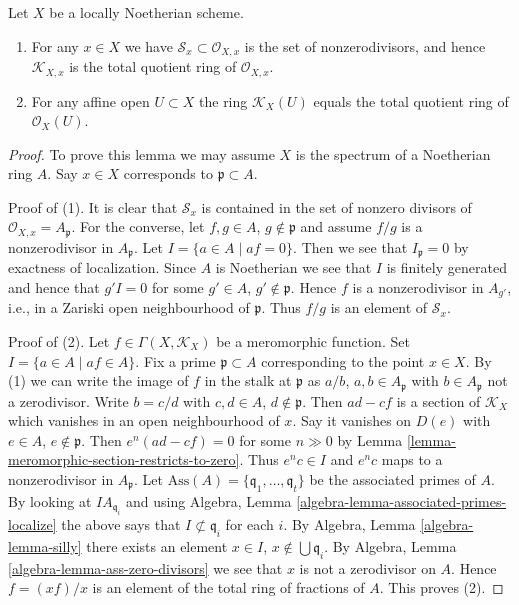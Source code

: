 \begin{lemma}
\label{lemma-locally-Noetherian-K}
Let $X$ be a locally Noetherian scheme.
\begin{enumerate}
\item For any $x \in X$ we have $\mathcal{S}_x \subset \mathcal{O}_{X, x}$
is the set of nonzerodivisors, and hence $\mathcal{K}_{X, x}$
is the total quotient ring of $\mathcal{O}_{X, x}$.
\item For any affine open $U \subset X$ the ring
$\mathcal{K}_X(U)$ equals the total quotient ring of $\mathcal{O}_X(U)$.
\end{enumerate}
\end{lemma}

\begin{proof}
To prove this lemma we may assume $X$ is the spectrum of a Noetherian
ring $A$. Say $x \in X$ corresponds to $\mathfrak p \subset A$.

\medskip\noindent
Proof of (1). It is clear that $\mathcal{S}_x$ is contained
in the set of nonzero divisors of $\mathcal{O}_{X, x} = A_\mathfrak p$.
For the converse, let $f, g \in A$, $g \not \in \mathfrak p$ and
assume $f/g$ is a nonzerodivisor in $A_{\mathfrak p}$. Let
$I = \{a \in A \mid af = 0\}$. Then we see that $I_{\mathfrak p} = 0$ by
exactness of localization. Since $A$ is Noetherian we see that $I$
is finitely generated and hence that $g'I = 0$ for some $g' \in A$,
$g' \not \in \mathfrak p$. Hence $f$ is a nonzerodivisor
in $A_{g'}$, i.e., in a Zariski open neighbourhood of $\mathfrak p$.
Thus $f/g$ is an element of $\mathcal{S}_x$.

\medskip\noindent
Proof of (2). Let $f \in \Gamma(X, \mathcal{K}_X)$ be a meromorphic function.
Set $I = \{a \in A \mid af \in A\}$. Fix a prime $\mathfrak p \subset A$
corresponding to the point $x \in X$. By (1) we can write the image of $f$
in the stalk at $\mathfrak p$ as $a/b$, $a, b \in A_{\mathfrak p}$ with
$b \in A_{\mathfrak p}$ not a zerodivisor. Write $b = c/d$ with
$c, d \in A$, $d \not \in \mathfrak p$. Then $ad - cf$ is a section of
$\mathcal{K}_X$ which vanishes in an open neighbourhood of $x$. Say it
vanishes on $D(e)$ with $e \in A$, $e \not \in \mathfrak p$. Then
$e^n(ad - cf) = 0$ for some $n \gg 0$ by
Lemma \ref{lemma-meromorphic-section-restricts-to-zero}.
Thus $e^nc \in I$ and $e^nc$ maps to a nonzerodivisor in
$A_{\mathfrak p}$. Let
$\text{Ass}(A) = \{\mathfrak q_1, \ldots, \mathfrak q_t\}$ be the
associated primes of $A$. By looking at $IA_{\mathfrak q_i}$ and
using Algebra, Lemma \ref{algebra-lemma-associated-primes-localize}
the above says that
$I \not \subset \mathfrak q_i$ for each $i$. By
Algebra, Lemma \ref{algebra-lemma-silly}
there exists an element $x \in I$, $x \not \in \bigcup \mathfrak q_i$.
By Algebra, Lemma \ref{algebra-lemma-ass-zero-divisors}
we see that $x$ is not a zerodivisor on $A$.
Hence $f = (xf)/x$ is an element of the total ring of fractions of $A$.
This proves (2).
\end{proof}


